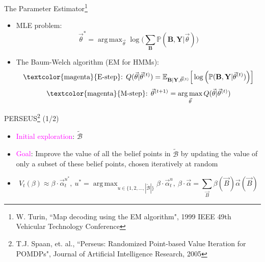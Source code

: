 \documentclass{beamer}
\DeclareMathOperator*{\argmax}{arg\,max}
\begin{document}
\begin{frame}{The Parameter Estimator\footnote{\tiny{W. Turin, ``Map decoding using the EM algorithm", 1999 IEEE 49th Vehicular Technology Conference}}}
    \begin{itemize}
        \item MLE problem:
        \[\vec{\theta}^{*} = \argmax_{\vec{\theta}} \log\Big(\sum_{\mathbf{B}} \mathbb{P}(\mathbf{B}, \mathbf{Y}| \vec{\theta})\Big)\]
        \item The Baum-Welch algorithm (EM for HMMs):
        \[\text{\textcolor{magenta}{E-step}: }Q(\vec{\theta}|\vec{\theta}^{(t)}) = \mathbb{E}_{\mathbf{B}|\mathbf{Y}, \vec{\theta}^{(t)}} \Big[ \log \Big(\mathbb{P}(\mathbf{B}, \mathbf{Y}|\vec{\theta}^{(t)})\Big)\Big]\]
        \[\text{\textcolor{magenta}{M-step}: }\vec{\theta}^{(t+1)} = \argmax_{\vec{\theta}} Q(\vec{\theta}|\vec{\theta}^{(t)})\]
    \end{itemize}
\end{frame}
\begin{frame}{PERSEUS\footnote{\tiny{T.J. Spaan, et. al., ``Perseus: Randomized Point-based Value Iteration for POMDPs", Journal of Artificial Intelligence Research, 2005}} (1/2)}
\begin{itemize}
        \item \textcolor{magenta}{Initial exploration}: $\tilde{\mathcal{B}}$
        \item \textcolor{magenta}{Goal}: Improve the value of all the belief points in $\tilde{\mathcal{B}}$ by updating the value of only a subset of these belief points, chosen iteratively at random
        \item \[V_{t}(\beta) \approx \beta \cdot \vec{\alpha}_{t}^{u^*},\ u^* = \argmax_{u\in\{1,2,\dots,|\tilde{\mathcal{B}}|\}} \beta \cdot \vec{\alpha}_{t}^{u},\ \beta\cdot\vec{\alpha}{=}\sum_{\vec{B}}\beta(\vec{B})\vec{\alpha}(\vec{B})\]
\end{itemize}
\end{frame}
\end{document}
